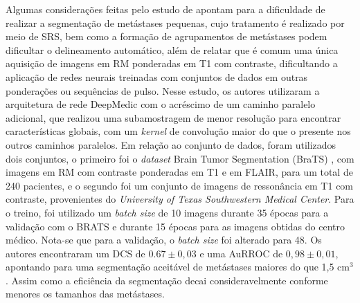 Algumas considerações feitas pelo estudo de \cite{Liu:2017} apontam para a dificuldade de realizar a segmentação de metástases pequenas, cujo tratamento é realizado por meio de SRS, bem como a formação de agrupamentos de metástases podem dificultar o delineamento automático, além de relatar que é comum uma única aquisição de imagens em RM ponderadas em T1 com contraste, dificultando a aplicação de redes neurais treinadas com conjuntos de dados em outras ponderações ou sequências de pulso. Nesse estudo, os autores utilizaram a arquitetura de rede DeepMedic com o acréscimo de um caminho paralelo adicional, que realizou uma subamostragem de menor resolução para encontrar características globais, com um \textit{kernel} de convolução maior do que o presente nos outros caminhos paralelos. Em relação ao conjunto de dados, foram utilizados dois conjuntos, o primeiro foi o \textit{dataset} Brain Tumor Segmentation (BraTS) \cite{BRATS:2015}, com imagens em RM com contraste ponderadas em T1 e em FLAIR, para um total de 240 pacientes, e o segundo foi um conjunto de imagens de ressonância em T1 com contraste, provenientes do \textit{University of Texas Southwestern Medical Center}. Para o treino, foi utilizado um \textit{batch size} de 10 imagens durante 35 épocas para a validação com o BRATS e durante 15 épocas para as imagens obtidas do centro médico. Nota-se que para a validação, o \textit{batch size} foi alterado para 48. Os autores encontraram um DCS de $0.67 \pm 0,03$ e uma AuRROC de $0,98 \pm 0,01$, apontando para uma segmentação aceitável de metástases maiores do que 1,5 cm$^3$. Assim como \cite{Hu:2019,Rudie:2021} a eficiência da segmentação decai consideravelmente conforme menores os tamanhos das metástases.

